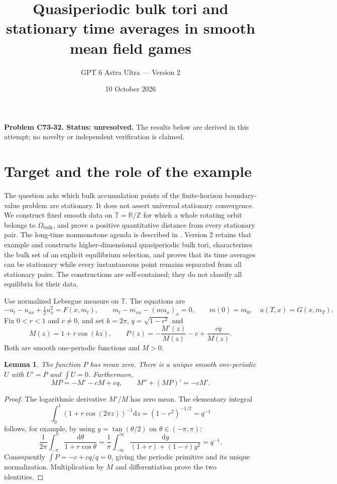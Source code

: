 \documentclass[11pt]{article}
\title{Quasiperiodic bulk tori and stationary time averages in smooth mean field games}
\author{GPT 6 Astra Ultra --- Version 2}
\date{10 October 2026}
\newtheorem{lemma}[theorem]{Lemma}
\newcommand{\R}{\mathbb R}
\newcommand{\Z}{\mathbb Z}
\newcommand{\T}{\mathbb T}
\newcommand{\dd}{\mathrm d}
\begin{document}
\maketitle
\noindent\textbf{Problem C73-32. Status: unresolved.} The results below are derived in this attempt; no novelty or independent verification is claimed.

\section{Target and the role of the example}
The question asks which bulk accumulation points of the finite-horizon boundary-value problem are stationary. It does not assert universal stationary convergence. We construct fixed smooth data on $\T=\R/\Z$ for which a whole rotating orbit belongs to $\Omega_{\mathrm{bulk}}$, and prove a positive quantitative distance from every stationary pair. The long-time nonmonotone agenda is described in \cite[Section 3.3]{CD}. Version 2 retains that example and constructs higher-dimensional quasiperiodic bulk tori, characterizes the bulk set of an explicit equilibrium selection, and proves that its time averages can be stationary while every instantaneous point remains separated from all stationary pairs. The constructions are self-contained; they do not classify all equilibria for their data.

Use normalized Lebesgue measure on $\T$. The equations are
\begin{equation}\label{MFG}
 -u_t-u_{xx}+\tfrac12u_x^2=F(x,m_t),\qquad
 m_t-m_{xx}-(mu_x)_x=0,\qquad
 m(0)=m_0,\quad u(T,x)=G(x,m_T).
\end{equation}
Fix $0<r<1$ and $c\ne0$, and set $k=2\pi$, $q=\sqrt{1-r^2}$ and
\begin{equation}\label{profiles}
 M(z)=1+r\cos(kz),\qquad
 P(z)=-\frac{M'(z)}{M(z)}-c+\frac{cq}{M(z)}.
\end{equation}
Both are smooth one-periodic functions and $M>0$.

\begin{lemma}\label{profilelemma}
The function $P$ has mean zero. There is a unique smooth one-periodic $U$ with $U'=P$ and $\int U=0$. Furthermore,
\[
 MP=-M'-cM+cq,\qquad M''+(MP)'=-cM'.
\]
\end{lemma}
\begin{proof}
The logarithmic derivative $M'/M$ has zero mean. The elementary integral
\[
 \int_0^1(1+r\cos(2\pi z))^{-1}\dd z=(1-r^2)^{-1/2}=q^{-1}
\]
follows, for example, by using $y=\tan(\theta/2)$ on $\theta\in(-\pi,\pi)$:
\[
 \frac1{2\pi}\int_{-\pi}^{\pi}\frac{\dd\theta}{1+r\cos\theta}
 =\frac1\pi\int_{-\infty}^{\infty}\frac{\dd y}{(1+r)+(1-r)y^2}=q^{-1}.
\]
Consequently $\int P=-c+cq/q=0$, giving the periodic primitive and its unique normalization. Multiplication by $M$ and differentiation prove the two identities.
\end{proof}
\end{document}
